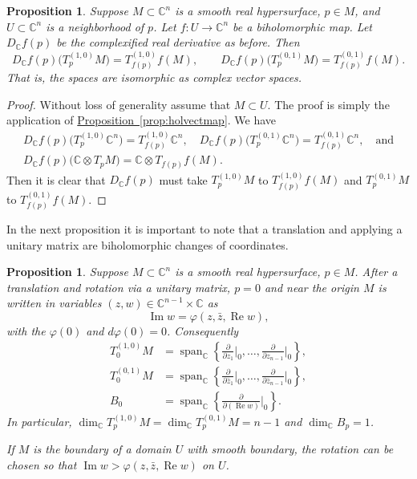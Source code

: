 \documentclass[12pt,openany]{book}
\renewcommand{\Re}{\operatorname{Re}}
\renewcommand{\Im}{\operatorname{Im}}
\newcommand{\C}{{\mathbb{C}}}
\theoremstyle{plain}
\newtheorem{prop}[thm]{Proposition}
\theoremstyle{remark}
\theoremstyle{definition}
\theoremstyle{exercise}
\theoremstyle{example}
\newcommand{\propref}[1]{\hyperref[#1]{Proposition~\ref*{#1}}}
\begin{document}
\begin{prop}
Suppose $M \subset \C^n$ is a smooth real hypersurface, $p \in M$,
and $U \subset \C^n$ is a neighborhood of $p$.
Let $f \colon U \to \C^n$ be a biholomorphic map.  Let $D_\C f(p)$ be
the complexified real derivative as before.  Then
\begin{equation*}
D_\C f(p)\bigl(T_p^{(1,0)}M\bigr) = T_{f(p)}^{(1,0)}f(M), \qquad
D_\C f(p)\bigl(T_p^{(0,1)}M\bigr) = T_{f(p)}^{(0,1)}f(M).
\end{equation*}
That is, the spaces are isomorphic as complex vector spaces.
\end{prop}

\begin{proof}
Without loss of generality assume that $M \subset U$.
The proof is simply the application of \propref{prop:holvectmap}.  We have
\begin{multline*}
D_\C f(p)\bigl(T_p^{(1,0)}\C^n\bigr) = T_{f(p)}^{(1,0)}\C^n, \quad 
D_\C f(p)\bigl(T_p^{(0,1)}\C^n\bigr) = T_{f(p)}^{(0,1)}\C^n, \quad
\text{and} \\
D_\C f(p)\bigl(\C \otimes T_pM\bigr) =\C \otimes  T_{f(p)}f(M) .
\end{multline*}
Then it is clear that $D_\C f(p)$ must take
$T_p^{(1,0)}M$ to $T_{f(p)}^{(1,0)}f(M)$ and
$T_p^{(0,1)}M$ to $T_{f(p)}^{(0,1)}f(M)$.
\end{proof}

In the next proposition it is important to note that a translation and
applying a unitary matrix are biholomorphic changes of coordinates.

\begin{prop}
Suppose $M \subset \C^n$ is a smooth real hypersurface, $p \in M$.
After a translation and rotation via a unitary
matrix, $p=0$ and near the origin
$M$ is written in variables $(z,w) \in \C^{n-1}
\times \C$ as
\begin{equation*}
\Im w = \varphi(z,\bar{z},\Re w) ,
\end{equation*}
with the $\varphi(0)$  and $d\varphi(0) = 0$.  Consequently
\begin{align*}
T_0^{(1,0)} M
& = \operatorname{span}_{\C} \left\{
\frac{\partial}{\partial z_1}\Big|_0,
\ldots,
\frac{\partial}{\partial z_{n-1}}\Big|_0 \right\} ,
\\
T_0^{(0,1)} M
& = \operatorname{span}_{\C} \left\{
\frac{\partial}{\partial \bar{z}_1}\Big|_0,
\ldots,
\frac{\partial}{\partial \bar{z}_{n-1}}\Big|_0 \right\} ,
\\
B_0 & = \operatorname{span}_{\C} \left\{
\frac{\partial}{\partial (\Re w)}\Big|_0 \right\} .
\end{align*}
In particular,
$\dim_\C T_p^{(1,0)} M = \dim_\C T_p^{(0,1)} M = n-1$ and 
$\dim_\C B_p = 1$.

If $M$ is the boundary of a domain $U$ with smooth boundary,
the rotation can be chosen so that
$\Im w > \varphi(z,\bar{z},\Re w)$ on $U$.
\end{prop}
\end{document}
